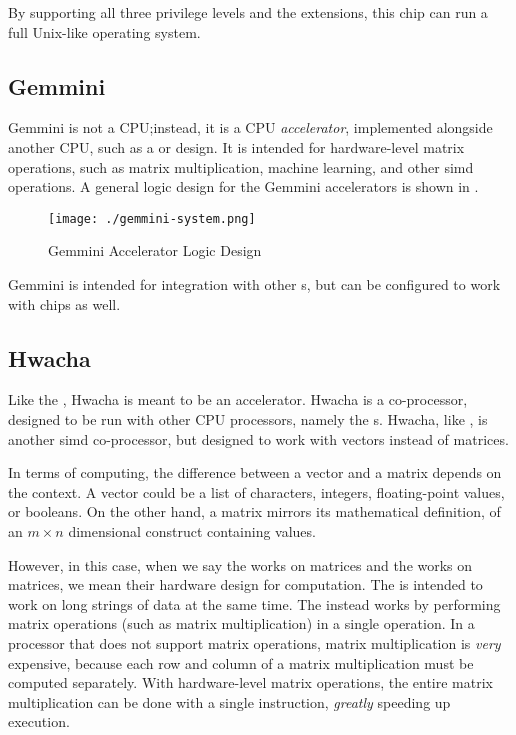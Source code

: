 By supporting all three privilege levels and the extensions, this chip can run a full Unix-like operating system.

\subsection{Gemmini}\label{sec:Gemmini_Generator}
\nocite{gemminiGithub}
\nocite{gemminiPaper}
Gemmini is not a CPU;\@ instead, it is a CPU \emph{\gls{accelerator}}, implemented alongside another CPU, such as a  or  design.
It is intended for hardware-level matrix operations, such as matrix multiplication, machine learning, and other \gls{simd} operations.
A general logic design for the Gemmini \glspl{accelerator} is shown in .

\begin{figure}[h!tbp]
  \centering
  \texttt{[image: ./gemmini-system.png]}
  \caption{Gemmini Accelerator Logic Design \parencite{gemminiGithub}}
  \label{fig:Gemmini_Accelerator}
\end{figure}

Gemmini is intended for integration with other s, but can be configured to work with  chips as well.

\subsection{Hwacha}\label{sec:Hwacha}
\nocite{hwachaGithub}
\nocite{hwachaPresentation}
Like the , Hwacha is meant to be an \gls{accelerator}.
Hwacha is a co-processor, designed to be run with other CPU processors, namely the s.
Hwacha, like , is another \gls{simd} co-processor, but designed to work with vectors instead of matrices.

In terms of computing, the difference between a vector and a matrix depends on the context.
A vector could be a list of characters, integers, floating-point values, or booleans.
On the other hand, a matrix mirrors its mathematical definition, of an $m \times n$ dimensional construct containing values.

However, in this case, when we say the  works on matrices and the  works on matrices, we mean their hardware design for computation.
The  is intended to work on long strings of data at the same time.
The  instead works by performing matrix operations (such as matrix multiplication) in a single operation.
In a processor that does not support matrix operations, matrix multiplication is \emph{very} expensive, because each row and column of a matrix multiplication must be computed separately.
With hardware-level matrix operations, the entire matrix multiplication can be done with a single instruction, \emph{greatly} speeding up execution.

